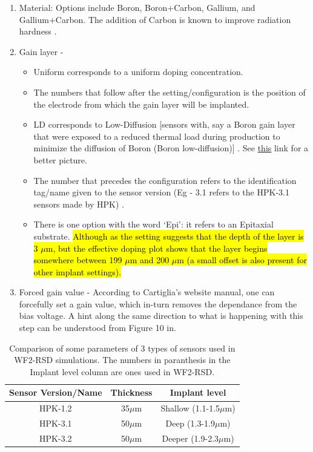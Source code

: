 \documentclass[11pt]{article}
\newcommand{\hlyellow}[1]{{\sethlcolor{yellow}\hl{#1}}}
\begin{document}
\begin{enumerate}
    \item Material: Options include Boron, Boron+Carbon, Gallium, and Gallium+Carbon. The addition of Carbon is known to improve radiation hardness \cite{ferrero-radiation-hardness}.
    \item Gain layer - 
        \begin{itemize}
            \item Uniform corresponds to a uniform doping concentration. 
            \item The numbers that follow after the setting/configuration is the position of the electrode from which the gain layer will be implanted. 
            \item LD corresponds to Low-Diffusion [sensors with, say a Boron gain layer that were exposed to a reduced thermal load during production to minimize the diffusion of Boron (Boron low-diffusion)] \cite{ferrero-radiation-hardness}. See \href{https://indico.cern.ch/event/806731/contributions/3516709/attachments/1926118/3188326/191013-VERTEX-RD50-mmoll-acceptor-removal.pdf}{this} link for a better picture.
            \item The number that precedes the configuration refers to the identification tag/name given to the sensor version (Eg - 3.1 refers to the HPK-3.1 sensors made by HPK) \cite{jadhav-sensor-variation, jin-sensor-variation}.
            \item There is one option with the word `Epi': it refers to an Epitaxial substrate. \hlyellow{Although as the setting suggests that the depth of the layer is 3 $\mu$m, but the effective doping plot shows that the layer begins somewhere between 199 $\mu$m and 200 $\mu$m (a small offset is also present for other implant settings).}
        \end{itemize}
    \item Forced gain value - According to Cartiglia's website manual, one can forcefully set a gain value, which in-turn removes the dependance from the bias voltage. A hint along the same direction to what is happening with this step can be understood from Figure 10 in\cite{ferrero-radiation-hardness}.
\end{enumerate}
\begin{table}[!h]
    \centering
    \begin{tabular}{|c|c|c|}
        \hline
        Sensor Version/Name & Thickness & Implant level        \\ \hline
        HPK-1.2             & 35$\mu$m & Shallow (1.1-1.5$\mu$m) \\ \hline
        HPK-3.1             & 50$\mu$m & Deep (1.3-1.9$\mu$m)    \\ \hline
        HPK-3.2             & 50$\mu$m & Deeper (1.9-2.3$\mu$m)    \\ \hline
    \end{tabular}
    \caption{Comparison of some parameters of 3 types of sensors used in WF2-RSD simulations. The numbers in paranthesis in the Implant level column are ones used in WF2-RSD.}
    \label{tab:hpk-sensor-parameters}
\end{table}
\end{document}
